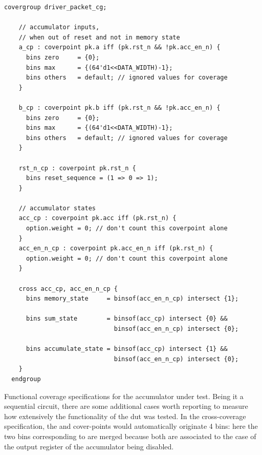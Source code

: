 \begin{listing}
\begin{verbatim}
covergroup driver_packet_cg;

    // accumulator inputs,
    // when out of reset and not in memory state
    a_cp : coverpoint pk.a iff (pk.rst_n && !pk.acc_en_n) {
      bins zero     = {0};
      bins max      = {(64'd1<<DATA_WIDTH)-1};
      bins others   = default; // ignored values for coverage
    }

    b_cp : coverpoint pk.b iff (pk.rst_n && !pk.acc_en_n) {
      bins zero     = {0};
      bins max      = {(64'd1<<DATA_WIDTH)-1};
      bins others   = default; // ignored values for coverage
    }

    rst_n_cp : coverpoint pk.rst_n {
      bins reset_sequence = (1 => 0 => 1);
    }

    // accumulator states
    acc_cp : coverpoint pk.acc iff (pk.rst_n) {
      option.weight = 0; // don't count this coverpoint alone
    }
    acc_en_n_cp : coverpoint pk.acc_en_n iff (pk.rst_n) {
      option.weight = 0; // don't count this coverpoint alone
    }

    cross acc_cp, acc_en_n_cp {
      bins memory_state     = binsof(acc_en_n_cp) intersect {1};

      bins sum_state        = binsof(acc_cp) intersect {0} &&
                              binsof(acc_en_n_cp) intersect {0};

      bins accumulate_state = binsof(acc_cp) intersect {1} &&
                              binsof(acc_en_n_cp) intersect {0};
    }
  endgroup
\end{verbatim}
\caption{Functional coverage specifications for the accumulator under test. Being it a sequential circuit, there are some additional cases worth reporting to measure how extensively the functionality of the \ac{dut} was tested. In the cross-coverage specification, the  and  cover-points would automatically originate 4 bins: here the two bins corresponding to  are merged because both are associated to the case of the output register of the accumulator being disabled.}
\label{list:acc_cg}
\end{listing}

